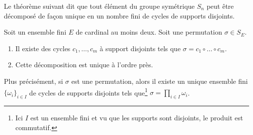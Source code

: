 Le théorème suivant dit que	tout élément du groupe symétrique \( S_n\) peut être décomposé de façon unique en un nombre fini de cycles de supports disjoints.
\begin{theorem}			\label{THOooPGGLooInzSFo}
	Soit un ensemble fini \( E\) de cardinal au moins deux. Soit une permutation \( \sigma\in S_E\).
	\begin{enumerate}
		\item Il existe des cycles \( c_1,\ldots, c_m\) à support disjoints tels que \( \sigma=c_1\circ\ldots \circ c_m\).
		\item
		      Cette décomposition est unique à l'ordre près.
	\end{enumerate}
	Plus précisément, si \( \sigma\) est une permutation, alors il existe un unique ensemble fini \( \{ \omega_i \}_{i\in I}\) de cycles de supports disjoints tels que\footnote{Ici \( I\) est un ensemble fini et vu que les supports sont disjoints, le produit est commutatif.} \( \sigma=\prod_{i\in I}\omega_i\).
\end{theorem}

